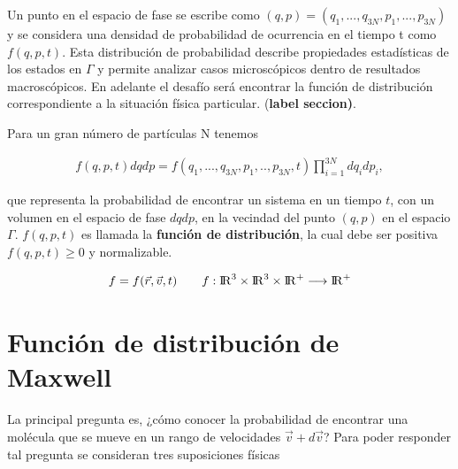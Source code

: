 \medskip

\noindent Un punto en el espacio de fase se escribe como $(q,p) = (q_{1}, ... ,q_{3N}, p_{1}, ... ,p_{3N})$ y se considera una densidad de probabilidad de ocurrencia en el tiempo t como $f(q,p,t)$. Esta distribución de probabilidad describe propiedades estadísticas de los estados en $\Gamma$ y permite analizar casos microscópicos dentro de resultados macroscópicos. En adelante el desafío será encontrar la función de distribución correspondiente a la situación física  particular. (\textbf{label seccion)}.

\medskip

\noindent Para un gran número de partículas N tenemos \cite{Schwabl}

\begin{eqnarray}
f(q,p,t)dqdp = f(q_{1}, ... , q_{3N},p_{1},..,p_{3N},t)\prod_{i=1}^{3N}dq_{i}dp_{i},
\end{eqnarray}

\noindent que representa la probabilidad de encontrar un sistema en un tiempo $t$, con un volumen en el espacio de fase $dqdp$, en la vecindad del punto $(q,p)$ en el espacio $\Gamma$. $f(q,p,t)$ es llamada la \textbf{función de distribución}, la cual debe ser positiva $f(q,p,t) \geq 0$ y normalizable. 

\begin{eqnarray}
f = f(\vec{r},\vec{v},t) \qquad f:{\rm I\!R}^{3}\times{\rm I\!R}^{3}\times{\rm I\!R}^{+}\longrightarrow{\rm I\!R}^{+}
\end{eqnarray}



\section{Función de distribución de Maxwell}

La principal pregunta es, ¿cómo conocer la probabilidad de encontrar una molécula que se mueve en un rango de velocidades $\vec{v}+d\vec{v}$? Para poder responder tal pregunta se consideran tres suposiciones físicas \cite{lecture2}

